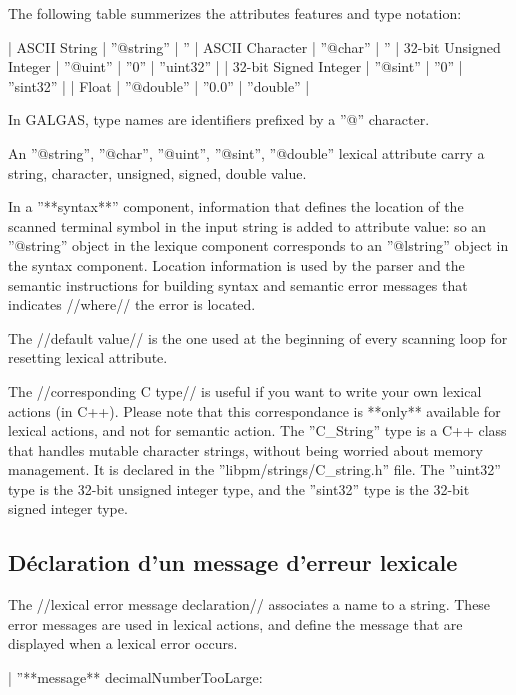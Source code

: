  The following table summerizes the attributes features and type notation:

| ASCII String | ''@string'' | ''%
| ASCII Character | ''@char'' | ''%
| 32-bit Unsigned Integer | ''@uint'' | ''0'' | ''uint32'' |
| 32-bit Signed Integer | ''@sint'' | ''0'' | ''sint32'' |
| Float | ''@double'' | ''0.0'' | ''double'' |

In GALGAS, type names are identifiers prefixed by a ''@'' character.

An ''@string'', ''@char'', ''@uint'', ''@sint'', ''@double'' lexical attribute carry a string, character, unsigned, signed, double value.

In a ''**syntax**'' component, information that defines the location of the scanned terminal symbol in the input string is added to attribute value: so an ''@string'' object in the lexique component corresponds to an ''@lstring'' object in the syntax component. Location information is used by the parser and the semantic instructions for building syntax and semantic error messages that indicates //where// the error is located.

The //default value// is the one used at the beginning of every scanning loop for resetting lexical attribute.

The //corresponding C type// is useful if you want to write your own lexical actions (in C++). Please note that this correspondance is **only** available for lexical actions, and not for semantic action. The ''C\_String'' type is a C++ class that handles mutable character strings, without being worried about memory management. It is declared in the ''libpm/strings/C\_string.h'' file. The ''uint32'' type is the 32-bit unsigned integer type, and the ''sint32'' type is the 32-bit signed integer type.


\subsection{Déclaration d'un message d'erreur lexicale}

The //lexical error message declaration// associates a name to a string. These error messages are used in lexical actions, and define the message that are displayed when a lexical error occurs.

|  ''**message** decimalNumberTooLarge: %



